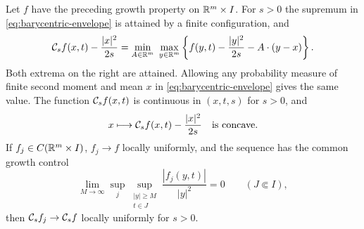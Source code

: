 \begin{lemma}\label{lem:barycentric-envelope}
Let $f$ have the preceding growth property on $\mathbb{R}^m\times I$.
For $s>0$ the supremum in \eqref{eq:barycentric-envelope} is
attained by a finite configuration, and
\begin{equation}\label{eq:barycentric-duality}
  \mathcal{C}_s f(x,t)-\frac{|x|^2}{2s}
   =\min_{A\in\mathbb{R}^m}\ \max_{y\in\mathbb{R}^m}
       \left\{f(y,t)-\frac{|y|^2}{2s}-A\cdot(y-x)\right\}.
\end{equation}
Both extrema on the right are attained. Allowing any probability
measure of finite second moment and mean $x$ in
\eqref{eq:barycentric-envelope} gives the same value.
The function $\mathcal{C}_s f(x,t)$ is continuous in $(x,t,s)$ for
$s>0$, and
\begin{equation}\label{eq:barycentric-semiconcavity}
  x\longmapsto\mathcal{C}_s f(x,t)-\frac{|x|^2}{2s}
       \quad\text{is concave}.
\end{equation}
If $f_j\in C(\mathbb{R}^m\times I)$, $f_j\to f$ locally uniformly, and the sequence has the common
growth control
\[
  \lim_{M\to\infty}
  \sup_j\sup_{\substack{|y|\ge M\\t\in J}}
       \frac{|f_j(y,t)|}{|y|^2}=0
       \qquad(J\Subset I),
\]
then $\mathcal{C}_s f_j\to\mathcal{C}_s f$ locally uniformly for $s>0$.
\end{lemma}

